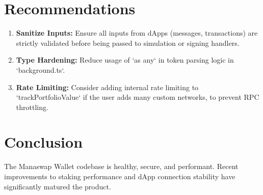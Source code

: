 \documentclass[11pt, a4paper]{article}
\begin{document}
\section{Recommendations}

\begin{enumerate}
    \item \textbf{Sanitize Inputs:} Ensure all inputs from dApps (messages, transactions) are strictly validated before being passed to simulation or signing handlers.
    \item \textbf{Type Hardening:} Reduce usage of `as any` in token parsing logic in `background.ts`.
    \item \textbf{Rate Limiting:} Consider adding internal rate limiting to `trackPortfolioValue` if the user adds many custom networks, to prevent RPC throttling.
\end{enumerate}

\section{Conclusion}
The Manaswap Wallet codebase is healthy, secure, and performant. Recent improvements to staking performance and dApp connection stability have significantly matured the product.
\end{document}
